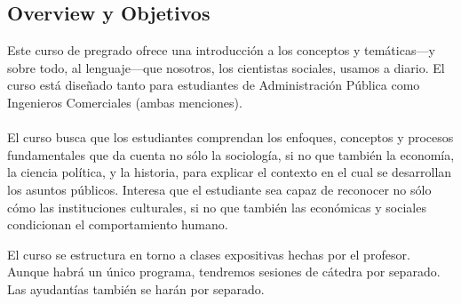 \documentclass[letterpaper]{article}
\renewenvironment{itemize}{
  \begin{list}{}{
    \setlength{\leftmargin}{1.5em}
  }
}{
  \end{list}
}
\begin{document}
\subsection*{Overview y Objetivos}

Este {\color{blue}curso de pregrado} ofrece una introducci\'on a los conceptos y tem\'aticas---y sobre todo, al lenguaje---que nosotros, los cientistas sociales, usamos a diario. El curso est\'a dise\~nado tanto para estudiantes de Administraci\'on P\'ublica como Ingenieros Comerciales (ambas menciones). 
\\
\\
El curso busca que los estudiantes comprendan los enfoques, conceptos y procesos fundamentales que da cuenta no s\'olo la sociolog\'ia, si no que tambi\'en la econom\'ia, la ciencia pol\'itica, y la historia, para explicar el contexto en el cual se desarrollan los asuntos p\'ublicos. Interesa que el estudiante sea capaz de reconocer no s\'olo c\'omo las instituciones culturales, si no que tambi\'en las econ\'omicas y sociales condicionan el comportamiento humano.


\begin{itemize}
    \item[\Pointinghand] El curso se estructura en torno a clases expositivas hechas por el profesor. Aunque habr\'a un \'unico programa, {\color{blue}tendremos sesiones de c\'atedra por separado}. Las ayudant\'ias tambi\'en se har\'an por separado.
\end{itemize}
\end{document}
